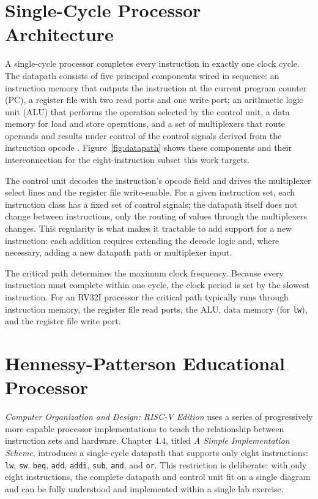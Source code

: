 \section{Single-Cycle Processor Architecture}

A single-cycle processor completes every instruction in exactly one clock cycle. The datapath consists
of five principal components wired in sequence: an instruction memory that outputs the instruction at
the current program counter (PC), a register file with two read ports and one write port; an arithmetic
logic unit (ALU) that performs the operation selected by the control unit, a data memory for load and
store operations, and a set of multiplexers that route operands and results under control of the
control signals derived from the instruction opcode \cite{patterson2020}.
Figure~\ref{fig:datapath} shows these components and their interconnection for the eight-instruction
subset this work targets.

The control unit decodes the instruction's opcode field and drives the multiplexer select lines and the
register file write-enable. For a given instruction set, each instruction class has a fixed set of
control signals; the datapath itself does not change between instructions, only the routing of values
through the multiplexers changes. This regularity is what makes it tractable to add support for a new
instruction: each addition requires extending the decode logic and, where necessary, adding a new
datapath path or multiplexer input.

The critical path determines the maximum clock frequency. Because every instruction must complete
within one cycle, the clock period is set by the slowest instruction. For an RV32I processor the
critical path typically runs through instruction memory, the register file read ports, the ALU, data
memory (for \texttt{lw}), and the register file write port.

\section{Hennessy-Patterson Educational Processor}

\textit{Computer Organization and Design: RISC-V Edition} \cite{patterson2020} uses a series of
progressively more capable processor implementations to teach the relationship between instruction sets
and hardware. Chapter 4.4, titled \textit{A Simple Implementation Scheme}, introduces a single-cycle
datapath that supports only eight instructions: \texttt{lw}, \texttt{sw}, \texttt{beq}, \texttt{add},
\texttt{addi}, \texttt{sub}, \texttt{and}, and \texttt{or}. This restriction is deliberate: with only
eight instructions, the complete datapath and control unit fit on a single diagram and can be fully
understood and implemented within a single lab exercise.

